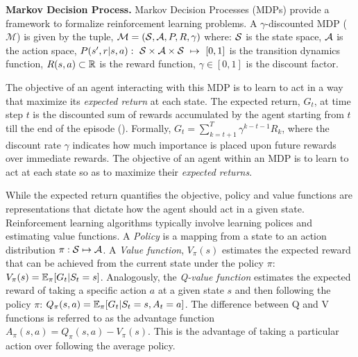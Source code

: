 \textbf{Markov Decision Process.}
Markov Decision Processes (MDPs) provide a framework to formalize reinforcement learning problems.
A $\gamma$-discounted MDP ($\mathcal{M}$) is given by the tuple, $\mathcal{M}=(\mathcal{S}, \mathcal{A}, P, R,
	\gamma)$ where: $\mathcal{S}$ is the state space, $\mathcal{A}$ is the action space,
$P(s',r|s,a):~\mathcal{S}\times\mathcal{A}\times\mathcal{S}~\mapsto~[0,1]$ is the transition dynamics function,
$R(s,a) \subset \mathbb{R}$ is the reward function, $\gamma \in [0,1]$ is the discount factor.

The objective of an agent interacting with this MDP is to learn to act in a way that maximize its
\textit{expected return} at each state.
The expected return, $G_t$, at time step $t$ is the discounted sum of rewards accumulated by the
agent starting from $t$ till the end of the episode ().
Formally, $G_t = \sum_{k=t+1}^{T} \gamma^{k-t-1} R_k$, where the discount rate $\gamma$ indicates
how much importance is placed upon future rewards over immediate rewards.
The objective of an agent within an MDP is to learn to act at each state so as to maximize their
\textit{expected returns}.

While the expected return quantifies the objective, policy and value functions are representations
that dictate how the agent should act in a given state.
Reinforcement learning algorithms typically involve learning polices and estimating value
functions.
A \textit{Policy} is a mapping from a state to an action distribution $\pi: \mathcal{S} \mapsto \mathcal{A}$.
A \textit{Value function}, $V_{\pi}(s)$ estimates the expected reward that can be achieved from the
current state under the policy $\pi$: $V_{\pi}(s) = \mathbb{E}_{\pi}[G_t | S_t = s]$.
Analogously, the \textit{Q-value function} estimates the expected reward of taking a specific
action $a$ at a given state $s$ and then following the policy $\pi$: $ Q_{\pi}(s, a) = \mathbb{E}_{\pi}[G_t
		| S_t = s, A_t = a] $.
The difference between Q and V functions is referred to as the advantage function $A_\pi(s,a) =
	Q_\pi(s,a) - V_\pi(s)$.
This is the advantage of taking a particular action over following the average policy.

